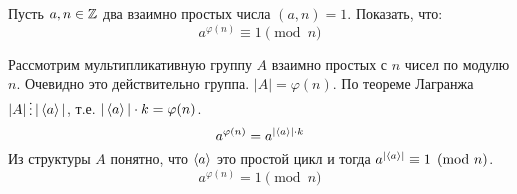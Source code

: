 \begin{exercise}
    Пусть \(a, n \in \mathbb{Z}\) два взаимно простых числа \((a, n) = 1\). Показать, что:
    \[a^{\varphi(n)} \equiv 1 \pmod n\]
\end{exercise}
\begin{solution}
    Рассмотрим мультипликативную группу \(A\) взаимно простых с \(n\) чисел по модулю \(n\). Очевидно это действительно группа. \(|A| = \varphi(n)\). По теореме Лагранжа \(|A| \divided |\ev{a}|\), т.е. \(|\ev{a}| \cdot k = \varphi(n)\).
    \[a^{\varphi(n)} = a^{|\ev{a}| \cdot k}\]
    Из структуры \(A\) понятно, что \(\ev{a}\) это простой цикл и тогда \(a^{|\ev{a}|} \equiv 1 \pmod n\).
    \[a^{\varphi(n)} = 1 \pmod n\]
\end{solution}


